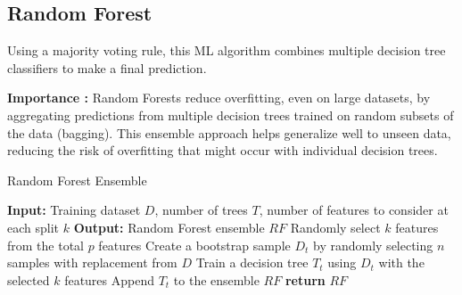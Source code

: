 \subsection{Random Forest}
{
Using a majority voting rule, this ML algorithm 
\cite{hastie2009random}  combines multiple decision tree classifiers to make a final prediction.

\par \textbf{Importance :}
Random Forests reduce overfitting, even on large datasets, by aggregating predictions from multiple decision trees trained on random subsets of the data (bagging). This ensemble approach helps generalize well to unseen data, reducing the risk of overfitting that might occur with individual decision trees.
\begin{algorithm}
\caption{Random Forest Ensemble}
\label{alg:random_forest}
\begin{algorithmic}[1]
\Statex \textbf{Input:} Training dataset $D$, number of trees $T$, number of features to consider at each split $k$ 
\Statex \textbf{Output:} Random Forest ensemble $RF$
    \State Randomly select $k$ features from the total $p$ features
    \State Create a bootstrap sample $D_t$ by randomly selecting $n$ samples with replacement from $D$
    \State Train a decision tree $T_t$ using $D_t$ with the selected $k$ features
    \State Append $T_t$ to the ensemble $RF$
\EndFor
\State \textbf{return} $RF$
\end{algorithmic}
\end{algorithm}
}

